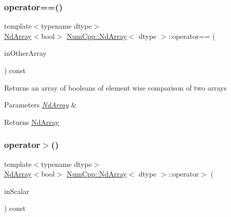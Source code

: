 \subsubsection{\texorpdfstring{operator==()}{operator==()}\hspace{0.1cm}{\footnotesize\ttfamily [2/2]}}
{\footnotesize\ttfamily template$<$typename dtype$>$ \\
\mbox{\hyperlink{class_num_cpp_1_1_nd_array}{Nd\+Array}}$<$bool$>$ \mbox{\hyperlink{class_num_cpp_1_1_nd_array}{Num\+Cpp\+::\+Nd\+Array}}$<$ dtype $>$\+::operator== (\begin{DoxyParamCaption}\item[{const \mbox{\hyperlink{class_num_cpp_1_1_nd_array}{Nd\+Array}}$<$ dtype $>$ \&}]{in\+Other\+Array }\end{DoxyParamCaption}) const\hspace{0.3cm}{\ttfamily [inline]}}

Returns an array of booleans of element wise comparison of two arrays


\begin{DoxyParams}{Parameters}
{\em \mbox{\hyperlink{class_num_cpp_1_1_nd_array}{Nd\+Array}}} & \\
\hline
\end{DoxyParams}
\begin{DoxyReturn}{Returns}
\mbox{\hyperlink{class_num_cpp_1_1_nd_array}{Nd\+Array}} 
\end{DoxyReturn}
\mbox{\label{class_num_cpp_1_1_nd_array_a0b0d33dd3713da9a966b1b08543303a2}} 
\subsubsection{\texorpdfstring{operator$>$()}{operator>()}\hspace{0.1cm}{\footnotesize\ttfamily [1/2]}}
{\footnotesize\ttfamily template$<$typename dtype$>$ \\
\mbox{\hyperlink{class_num_cpp_1_1_nd_array}{Nd\+Array}}$<$bool$>$ \mbox{\hyperlink{class_num_cpp_1_1_nd_array}{Num\+Cpp\+::\+Nd\+Array}}$<$ dtype $>$\+::operator$>$ (\begin{DoxyParamCaption}\item[{dtype}]{in\+Scalar }\end{DoxyParamCaption}) const\hspace{0.3cm}{\ttfamily [inline]}}


